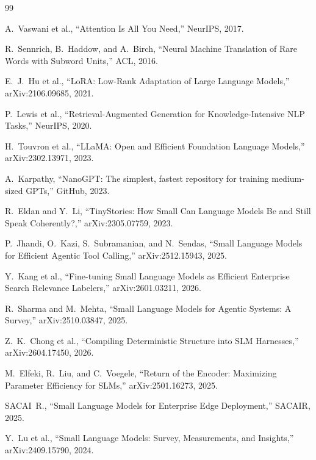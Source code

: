 \documentclass[11pt]{article}
\begin{document}
\begin{thebibliography}{99}

A.~Vaswani et al.,
``Attention Is All You Need,''
NeurIPS, 2017.

R.~Sennrich, B.~Haddow, and A.~Birch,
``Neural Machine Translation of Rare Words with Subword Units,''
ACL, 2016.

E.~J.~Hu et al.,
``LoRA: Low-Rank Adaptation of Large Language Models,''
arXiv:2106.09685, 2021.

P.~Lewis et al.,
``Retrieval-Augmented Generation for Knowledge-Intensive NLP Tasks,''
NeurIPS, 2020.

H.~Touvron et al.,
``LLaMA: Open and Efficient Foundation Language Models,''
arXiv:2302.13971, 2023.

A.~Karpathy,
``NanoGPT: The simplest, fastest repository for training medium-sized GPTs,''
GitHub, 2023.

R.~Eldan and Y.~Li,
``TinyStories: How Small Can Language Models Be and Still Speak Coherently?,''
arXiv:2305.07759, 2023.

P.~Jhandi, O.~Kazi, S.~Subramanian, and N.~Sendas,
``Small Language Models for Efficient Agentic Tool Calling,''
arXiv:2512.15943, 2025.

Y.~Kang et al.,
``Fine-tuning Small Language Models as Efficient Enterprise Search Relevance Labelers,''
arXiv:2601.03211, 2026.

R.~Sharma and M.~Mehta,
``Small Language Models for Agentic Systems: A Survey,''
arXiv:2510.03847, 2025.

Z.~K.~Chong et al.,
``Compiling Deterministic Structure into SLM Harnesses,''
arXiv:2604.17450, 2026.

M.~Elfeki, R.~Liu, and C.~Voegele,
``Return of the Encoder: Maximizing Parameter Efficiency for SLMs,''
arXiv:2501.16273, 2025.

SACAI~R.,
``Small Language Models for Enterprise Edge Deployment,''
SACAIR, 2025.

Y.~Lu et al.,
``Small Language Models: Survey, Measurements, and Insights,''
arXiv:2409.15790, 2024.


\end{thebibliography}
\end{document}
